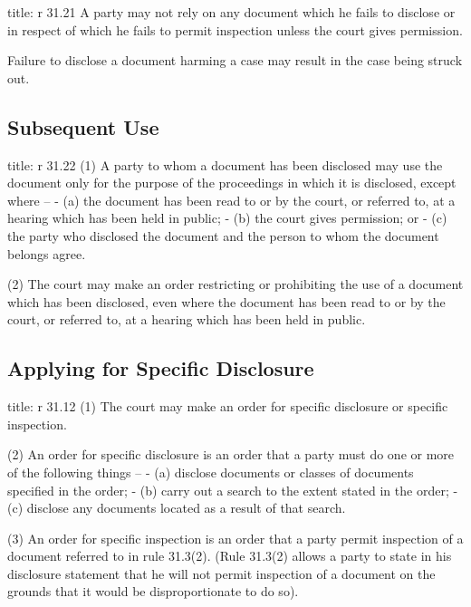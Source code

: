 \documentclass[
]{article}
\newenvironment{Shaded}{}{}
\newcommand{\NormalTok}[1]{#1}
\begin{document}
\begin{Shaded}
\begin{Highlighting}[]
\NormalTok{title: r 31.21}
\NormalTok{A party may not rely on any document which he fails to disclose or in respect of which he fails to permit inspection unless the court gives permission.}
\end{Highlighting}
\end{Shaded}

Failure to disclose a document harming a case may result in the case
being struck out.

\hypertarget{subsequent-use}{%
\subsection{Subsequent Use}\label{subsequent-use}}

\begin{Shaded}
\begin{Highlighting}[]
\NormalTok{title: r 31.22}
\NormalTok{(1) A party to whom a document has been disclosed may use the document only for the purpose of the proceedings in which it is disclosed, except where –}
\NormalTok{{-} (a) the document has been read to or by the court, or referred to, at a hearing which has been held in public;}
\NormalTok{{-} (b) the court gives permission; or}
\NormalTok{{-} (c) the party who disclosed the document and the person to whom the document belongs agree.}

\NormalTok{(2) The court may make an order restricting or prohibiting the use of a document which has been disclosed, even where the document has been read to or by the court, or referred to, at a hearing which has been held in public.}
\end{Highlighting}
\end{Shaded}

\hypertarget{applying-for-specific-disclosure}{%
\subsection{Applying for Specific
Disclosure}\label{applying-for-specific-disclosure}}

\begin{Shaded}
\begin{Highlighting}[]
\NormalTok{title: r 31.12}
\NormalTok{(1) The court may make an order for specific disclosure or specific inspection.}

\NormalTok{(2) An order for specific disclosure is an order that a party must do one or more of the following things –}
\NormalTok{{-} (a) disclose documents or classes of documents specified in the order;}
\NormalTok{{-} (b) carry out a search to the extent stated in the order;}
\NormalTok{{-} (c) disclose any documents located as a result of that search.}

\NormalTok{(3) An order for specific inspection is an order that a party permit inspection of a document referred to in rule 31.3(2). (Rule 31.3(2) allows a party to state in his disclosure statement that he will not permit inspection of a document on the grounds that it would be disproportionate to do so).}
\end{Highlighting}
\end{Shaded}
\end{document}
